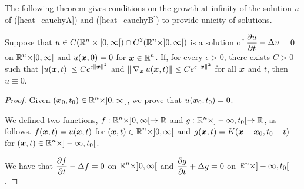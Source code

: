 The following theorem gives conditions on the growth at infinity of
the solution $u$ of (\ref{heat_cauchyA}) and (\ref{heat_cauchyB}) to
provide unicity of solutions.

\begin{prop}
Suppose that
$\displaystyle u \in C(\mathbb{R}^n \times [0,\infty[) \cap
C^2(\mathbb{R}^n \times ]0,\infty[)$
is a solution of
$\displaystyle \frac{\partial{u}}{\partial t} - \Delta u = 0$ on
$\displaystyle \mathbb{R}^n \times ]0,\infty[$
and $u({\bm{x}},0)=0$ for $\displaystyle {\bm{x}} \in \mathbb{R}^n$.  If, for every
$\epsilon >0$, there exists $C>0$ such that
$\displaystyle |u({\bm{x}},t)| \leq C e^{\epsilon \|{\bm{x}}\|^2}$
and
$\displaystyle \|\operatorname{\nabla}_{{\bm{x}}} u({\bm{x}},t)\| \leq C e^{\epsilon \|{\bm{x}}\|^2}$
for all ${\bm{x}}$ and $t$, then $u \equiv 0$.
\end{prop}

\begin{proof}
Given $\displaystyle ({\bm{x}}_0, t_0) \in \mathbb{R}^n \times ]0,\infty[$, we
prove that $u({\bm{x}}_0,t_0) = 0$.

We defined two functions, $\displaystyle f:\mathbb{R}^n\times ]0,\infty[ \to \mathbb{R}$ and
$\displaystyle g:\mathbb{R}^n\times ]-\infty,t_0[ \to \mathbb{R}$, as follows.
$f({\bm{x}},t) = u({\bm{x}},t)$ for
$\displaystyle ({\bm{x}},t)\in \mathbb{R}^n\times ]0,\infty[$
and $g({\bm{x}},t) = K({\bm{x}}-{\bm{x}}_0, t_0-t)$ for
$\displaystyle ({\bm{x}},t)\in \mathbb{R}^n\times ]-\infty, t_0[$.

We have that $\displaystyle \frac{\partial{f}}{\partial t} - \Delta f = 0$
on $\displaystyle \mathbb{R}^n \times ]0,\infty[$ and
$\displaystyle \frac{\partial{g}}{\partial t} + \Delta g = 0$ on $\mathbb{R}^n \times ]-\infty,t_0[$.


\end{proof}
